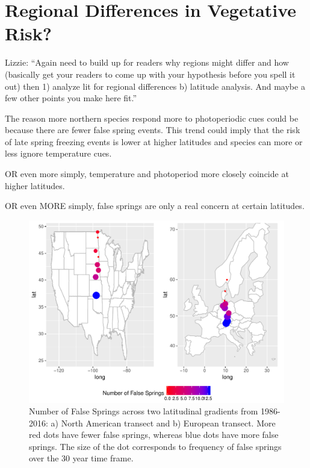 \documentclass{article}\usepackage[]{graphicx}\usepackage[]{color}
\begin{document}
\section*{Regional Differences in Vegetative Risk?}
Lizzie: ``Again need to build up for readers why regions might differ and how (basically get your readers to come up with your hypothesis before you spell it out) then 1) analyze lit for regional differences b) latitude analysis. And maybe a few other points you make here fit.''

The reason more northern species respond more to photoperiodic cues could be because there are fewer false spring events. This trend could imply that the risk of late spring freezing events is lower at higher latitudes and species can more or less ignore temperature cues. 

OR even more simply, temperature and photoperiod more closely coincide at higher latitudes.

OR even MORE simply, false springs are only a real concern at certain latitudes.

\begin{figure} [H]
\begin{center}
\caption{Number of False Springs across two latitudinal gradients from 1986-2016: a) North American transect and b) European transect. More red dots have fewer false springs, whereas blue dots have more false springs. The size of the dot corresponds to frequency of false springs over the 30 year time frame. }
\includegraphics{..//figure/lat_maps.pdf}
\end{center}
\end{figure}
\end{document}
